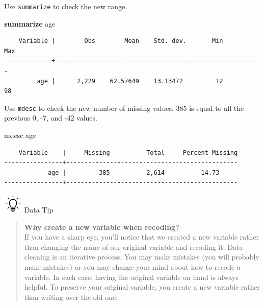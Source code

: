 \documentclass[
]{book}
\newenvironment{Shaded}{\begin{snugshade}}{\end{snugshade}}
\newcommand{\KeywordTok}[1]{\textcolor[rgb]{0.13,0.29,0.53}{\textbf{#1}}}
\newcommand{\NormalTok}[1]{#1}
\begin{document}
Use \texttt{summarize} to check the new range.

\begin{Shaded}
\begin{Highlighting}[]
\KeywordTok{summarize}\NormalTok{ age }
\end{Highlighting}
\end{Shaded}

\begin{verbatim}
    Variable |        Obs        Mean    Std. dev.       Min        Max
-------------+---------------------------------------------------------
         age |      2,229    62.57649    13.13472         12         98
\end{verbatim}

Use \texttt{mdesc} to check the new number of missing values. 385 is equal to all the previous 0, -7, and -42 values.

\begin{Shaded}
\begin{Highlighting}[]
\NormalTok{mdesc age}
\end{Highlighting}
\end{Shaded}

\begin{verbatim}
    Variable    |     Missing          Total     Percent Missing
----------------+-----------------------------------------------
            age |         385          2,614          14.73
----------------+-----------------------------------------------
\end{verbatim}

\includegraphics[width=0.36458in,height=\textheight]{images/bulb.png} Data Tip

\begin{quote}
\textbf{Why create a new variable when recoding?}\\
If you have a sharp eye, you'll notice that we created a new variable rather than changing the name of our original variable and recoding it. Data cleaning is an iterative process. You may make mistakes (you will probably make mistakes) or you may change your mind about how to recode a variable. In each case, having the original variable on hand is always helpful. To preserve your original variable, you create a new variable rather than writing over the old one.
\end{quote}
\end{document}
